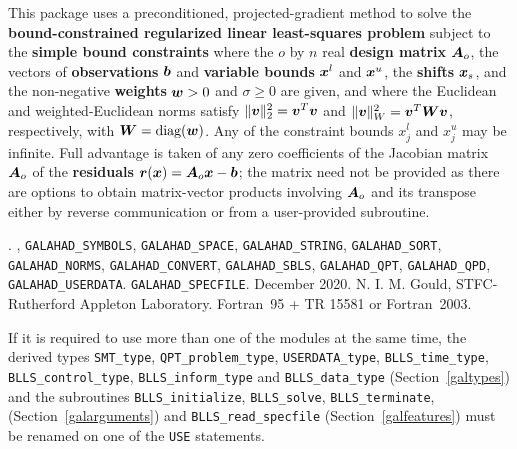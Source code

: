 \documentclass{galahad}
\newcommand{\packagename}{BLLS}
\newcommand{\fullpackagename}{\libraryname\_\packagename}
\begin{document}
\galheader


\galsummary
This package uses a preconditioned, projected-gradient method
to solve the {\bf bound-constrained regularized linear least-squares problem}
subject to the {\bf simple bound constraints}
where the $o$ by $n$ real {\bf design matrix} ${\bm{A}}_o$, the vectors 
of {\bf observations} ${\bm{b}}$ and 
{\bf variable bounds} ${\bm{x}}^{l}$ and ${\bm{x}}^{u}$, the {\bf shifts} ${\bm{x}}_s$, 
and the non-negative {\bf weights} ${\bm{w}} > 0$ and $\sigma \geq 0$ are given, 
and where the Euclidean and weighted-Euclidean norms
satisfy $\|{\bm{v}}\|_2^2 = {\bm{v}}^T {\bm{v}}$ and $\|{\bm{v}}\|_W^2 = {\bm{v}}^T {\bm{W}} {\bm{v}}$,
respectively, with ${\bm{W}} = \mbox{diag}({\bm{w}})$.
Any of the constraint bounds $x_{j}^{l}$ and $x_{j}^{u}$ may be infinite.
Full advantage is taken of any zero coefficients of the Jacobian matrix 
${\bm{A}}_o$ of the {\bf residuals} ${\bm{r}}({\bm{x}}) = {\bm{A}}_o {\bm{x}} - {\bm{b}}$;
the matrix need not be provided as there are options to obtain matrix-vector
products involving ${\bm{A}}_o$ and its transpose either by reverse communication
or from a user-provided subroutine.


\galattributes
\galversions{\tt  \fullpackagename\_single, \fullpackagename\_double}.
,
{\tt GALAHAD\-\_SY\-M\-BOLS},
{\tt GALAHAD\-\_\-SPACE},
{\tt GALAHAD\_STRING},
{\tt GALAHAD\_SORT},
{\tt GALAHAD\_NORMS},
{\tt GALAHAD\_CONVERT},
{\tt GALAHAD\_SBLS},
{\tt GALAHAD\_QPT},
{\tt GALAHAD\_QPD},
{\tt GALAHAD\_USERDATA}.
{\tt GALAHAD\_SPECFILE}.
\galdate December 2020.
\galorigin N. I. M. Gould, STFC-Rutherford Appleton Laboratory.
\gallanguage Fortran~95 + TR 15581 or Fortran~2003.


\galhowto




\noindent
If it is required to use more than one of the modules at the same time, 
the derived types
{\tt SMT\_type},
{\tt QPT\_problem\_type},
{\tt USERDATA\-\_type},
{\tt \packagename\_time\_type},
{\tt \packagename\_control\_type},
{\tt \packagename\_inform\_type}
and
{\tt \packagename\_data\_type}
(Section~\ref{galtypes})
and the subroutines
{\tt \packagename\_initialize},
{\tt \packagename\_\-solve},
{\tt \packagename\_terminate},
(Section~\ref{galarguments})
and
{\tt \packagename\_read\_specfile}
(Section~\ref{galfeatures})
must be renamed on one of the {\tt USE} statements.
\end{document}
